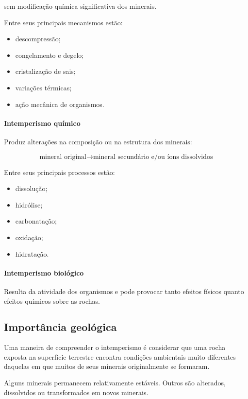 sem modificação química significativa dos minerais.

Entre seus principais mecanismos estão:

\begin{itemize}
    \item descompressão;
    \item congelamento e degelo;
    \item cristalização de sais;
    \item variações térmicas;
    \item ação mecânica de organismos.
\end{itemize}

\paragraph{Intemperismo químico}

Produz alterações na composição ou na estrutura dos minerais:

\[
\text{mineral original}
\rightarrow
\text{mineral secundário e/ou íons dissolvidos}
\]

Entre seus principais processos estão:

\begin{itemize}
    \item dissolução;
    \item hidrólise;
    \item carbonatação;
    \item oxidação;
    \item hidratação.
\end{itemize}

\paragraph{Intemperismo biológico}

Resulta da atividade dos organismos e pode provocar tanto efeitos físicos quanto efeitos químicos sobre as rochas.

\subsection{Importância geológica}

Uma maneira de compreender o intemperismo é considerar que uma rocha exposta na superfície terrestre encontra condições ambientais muito diferentes daquelas em que muitos de seus minerais originalmente se formaram.

Alguns minerais permanecem relativamente estáveis. Outros são alterados, dissolvidos ou transformados em novos minerais.

